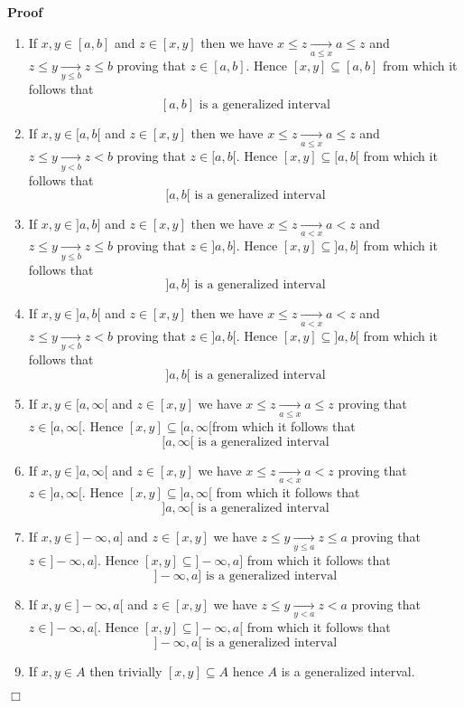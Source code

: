 \documentclass{book}
\newcommand{\Rightarrowlim}{\mathop{\rightarrow}\limits}
\newenvironment{proof}{\noindent\textbf{Proof\ }}{\hspace*{\fill}$\Box$\medskip}
\begin{document}
\begin{proof}
  
  \begin{enumerate}
    \item If $x, y \in [a, b]$ and $z \in [x, y]$ then we have $x \leqslant z
    \Rightarrowlim_{a \leqslant x} a \leqslant z$ and $z \leqslant y
    \Rightarrowlim_{y \leqslant b} z \leqslant b$ proving that $z \in [a, b]$.
    Hence $[x, y] \subseteq [a, b]$ from which it follows that
    \[ [a, b] \text{ is a generalized interval} \]
    \item If $x, y \in [a, b [$ and $z \in [x, y]$ then we have $x \leqslant z
    \Rightarrowlim_{a \leqslant x} a \leqslant z$ and $z \leqslant y
    \Rightarrowlim_{y < b} z < b$ proving that $z \in [a, b [$. Hence $[x, y]
    \subseteq [a, b [$ from which it follows that
    \[ [a, b [\text{ is a generalized interval} \]
    \item If $x, y \in] a, b]$ and $z \in [x, y]$ then we have $x \leqslant z
    \Rightarrowlim_{a < x} a < z$ and $z \leqslant y \Rightarrowlim_{y
    \leqslant b} z \leqslant b$ proving that $z \in] a, b]$. Hence $[x, y]
    \subseteq] a, b]$ from which it follows that
    \[ ] a, b] \text{ is a generalized interval} \]
    \item If $x, y \in] a, b [$ and $z \in [x, y]$ then we have $x \leqslant z
    \Rightarrowlim_{a < x} a < z$ and $z \leqslant y \Rightarrowlim_{y < b} z
    < b$ proving that $z \in] a, b [$. Hence $[x, y] \subseteq] a, b [$ from
    which it follows that
    \[ ] a, b [\text{ is a generalized interval} \]
    \item If $x, y \in [a, \infty [$ and $z \in [x, y]$ we have $x \leqslant z
    \Rightarrowlim_{a \leqslant x} a \leqslant z$ proving that $z \in [a,
    \infty [$. Hence $[x, y] \subseteq [a, \infty [$from which it follows that
    \[ [a, \infty [\text{ is a generalized interval} \]
    \item If $x, y \in] a, \infty [$ and $z \in [x, y]$ we have $x \leqslant z
    \Rightarrowlim_{a < x} a < z$ proving that $z \in] a, \infty [$. Hence
    $[x, y] \subseteq] a, \infty [$ from which it follows that
    \[ ] a, \infty [\text{ is a generalized interval} \]
    \item If $x, y \in] - \infty, a]$ and $z \in [x, y]$ we have $z \leqslant
    y \Rightarrowlim_{y \leqslant a} z \leqslant a$ proving that $z \in] -
    \infty, a]$. Hence $[x, y] \subseteq] - \infty, a]$ from which it follows
    that
    \[ ] - \infty, a] \text{ is a generalized interval} \]
    \item If $x, y \in] - \infty, a [$ and $z \in [x, y]$ we have $z \leqslant
    y \Rightarrowlim_{y < a} z < a$ proving that $z \in] - \infty, a [$. Hence
    $[x, y] \subseteq] - \infty, a [$ from which it follows that
    \[ ] - \infty, a [\text{ is a generalized interval} \]
    \item If $x, y \in A$ then trivially $[x, y] \subseteq A$ hence $A$ is a
    generalized interval.
  \end{enumerate}
\end{proof}
\end{document}
